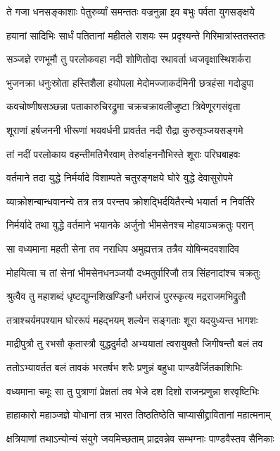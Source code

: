 \twolineshloka
{ते गजा धनसङ्काशाः पेतुरुर्व्यां समन्ततः}
{वज्रनुन्ना इव बभुः पर्वता युगसङ्क्षये}


\twolineshloka
{हयानां सादिभिः सार्धं पतितानां महीतले}
{राशयः स्म प्रदृश्यन्ते गिरिमात्रांस्ततस्ततः}


\twolineshloka
{सञ्जज्ञे रणभूमौ तु परलोकवहा नदी}
{शोणितोदा रथावर्ता ध्वजवृक्षास्थिशर्करा}


\twolineshloka
{भुजनक्रा धनुःस्रोता हस्तिशैला हयोपला}
{मेदोमज्जाकर्दमिनी छत्रहंसा गदोडुपा}


\twolineshloka
{कवचोष्णीषसञ्छन्ना पताकारुचिरद्रुमा}
{चक्रचक्रावलीजुष्टा त्रिवेणूरगसंवृता}


\twolineshloka
{शूराणां हर्षजननी भीरूणां भयवर्धनी}
{प्रावर्तत नदी रौद्रा कुरुसृञ्जयसङ्गमे}


\twolineshloka
{तां नदीं परलोकाय वहन्तीमतिभैरवाम्}
{तेरुर्वाहननौभिस्ते शूराः परिघबाहवः}


\twolineshloka
{वर्तमाने तदा युद्धे निर्मर्यादे विशाम्पते}
{चतुरङ्गक्षये घोरे युद्धे देवासुरोपमे}


\twolineshloka
{व्याक्रोशन्बान्धवानन्ये तत्र तत्र परन्तप}
{क्रोशद्भिर्दयितैरन्ये भयार्ता न निवर्तिरे}


\twolineshloka
{निर्मर्यादे तथा युद्धे वर्तमाने भयानके}
{अर्जुनो भीमसेनश्च मोहयाञ्चक्रतुः परान्}


\twolineshloka
{सा वध्यमाना महती सेना तव नराधिप}
{अमुह्यत्तत्र तत्रैव योषिन्मदवशादिव}


\twolineshloka
{मोहयित्वा च तां सेनां भीमसेनधनञ्जयौ}
{दध्मतुर्वारिजौ तत्र सिंहनादांश्च चक्रतुः}


\twolineshloka
{श्रुत्वैव तु महाशब्दं धृष्टद्युम्नशिखण्डिनौ}
{धर्मराजं पुरस्कृत्य मद्रराजमभिद्रुतौ}


\twolineshloka
{तत्राश्चर्यमपश्याम घोररूपं महद्भयम्}
{शल्येन सङ्गताः शूरा यदयुध्यन्त भागशः}


\twolineshloka
{माद्रीपुत्रौ तु रभसौ कृतास्त्रौ युद्धदुर्मदौ}
{अभ्ययातां त्वरायुक्तौ जिगीषन्तौ बलं तव}


\twolineshloka
{ततोऽभ्यावर्तत बलं तावकं भरतर्षभ}
{शरैः प्रणुन्नं बहुधा पाण्डवैर्जितकाशिभिः}


\twolineshloka
{वध्यमाना चमूः सा तु पुत्राणां प्रेक्षतां तव}
{भेजे दश दिशो राजन्प्रणुन्ना शरवृष्टिभिः}


\twolineshloka
{हाहाकारो महाञ्जज्ञे योधानां तत्र भारत}
{तिष्ठतिष्ठेति चाप्यासीद्द्रावितानां महात्मनाम्}


\twolineshloka
{क्षत्रियाणां तथाऽन्योन्यं संयुगे जयमिच्छताम्}
{प्राद्रवन्नेव सम्भग्नाः पाण्डवैस्तव सैनिकाः}


